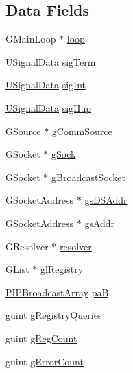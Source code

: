 \subsection*{Data Fields}
\begin{DoxyCompactItemize}
\item 
G\+Main\+Loop $\ast$ \hyperlink{struct__control_data_ae1b70bafbd5eb568c6ca339664959216}{loop}
\item 
\hyperlink{cmd_d_c_8c_a4d86cbb761613143e4ee60218efdfbaa}{U\+Signal\+Data} \hyperlink{struct__control_data_af45dc1f0c4806eaac0a57da17db50fdb}{sig\+Term}
\item 
\hyperlink{cmd_d_c_8c_a4d86cbb761613143e4ee60218efdfbaa}{U\+Signal\+Data} \hyperlink{struct__control_data_ae8ad5b5af46f4ab4bcd6ffb41e83385b}{sig\+Int}
\item 
\hyperlink{cmd_d_c_8c_a4d86cbb761613143e4ee60218efdfbaa}{U\+Signal\+Data} \hyperlink{struct__control_data_a551d0ecd4ceb9fc4ce8eebe5a984dc4c}{sig\+Hup}
\item 
G\+Source $\ast$ \hyperlink{struct__control_data_abfbd9e642ba240fa5985f63d60886de4}{g\+Comm\+Source}
\item 
G\+Socket $\ast$ \hyperlink{struct__control_data_a49b267275036fc3ac9b7d9e53b0625e1}{g\+Sock}
\item 
G\+Socket $\ast$ \hyperlink{struct__control_data_a05fab30fce92ebe541d9dd98220c60ef}{g\+Broadcast\+Socket}
\item 
G\+Socket\+Address $\ast$ \hyperlink{struct__control_data_a11c618822b208569a5d28206407326d5}{gs\+D\+S\+Addr}
\item 
G\+Socket\+Address $\ast$ \hyperlink{struct__control_data_a8a43853386551af4c746fd4b882eb2bf}{gs\+Addr}
\item 
G\+Resolver $\ast$ \hyperlink{struct__control_data_afe33a7083e1ecc9ba50a69644ed4a753}{resolver}
\item 
G\+List $\ast$ \hyperlink{struct__control_data_a34b1729bc0b37c9dce0327ea4cd8a812}{gl\+Registry}
\item 
\hyperlink{cmd_d_c_8c_a916d712cacebc2faeda930352280c361}{P\+I\+P\+Broadcast\+Array} \hyperlink{struct__control_data_a93f6e099a56c0d476607b4bd5a9dfa58}{pa\+B}
\item 
guint \hyperlink{struct__control_data_ab4837eb7cc16bf85fe0bd839a428eaa5}{g\+Registry\+Queries}
\item 
guint \hyperlink{struct__control_data_a81bfc0d50c23ebe6708e065659d11eb8}{g\+Reg\+Count}
\item 
guint \hyperlink{struct__control_data_a0dcc9f369186f6cf7c99b2178be66e58}{g\+Error\+Count}

\end{DoxyCompactItemize}
